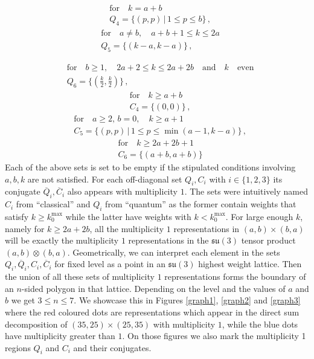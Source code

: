 \documentclass[a4paper,11pt]{article}
\theoremstyle{plain}
\theoremstyle{definition}
\newcommand{\mycomment}[1]{}
\newcommand{\kmax}{k_0^{\text{max}}}
\begin{document}
     \begin{align}\label{d4}
        &\text{for}\quad k=a+b \nonumber \\
        &Q_4=\{(p,p)\,|\, 1\leq p\leq b\}\,,
    \end{align}
     \begin{align}\label{d5}
        &\text{for}\quad a\neq b,\quad  a+b+1 \leq k\leq 2a \nonumber \\
        &Q_5=\{(k-a,k-a)\}\,,
    \end{align}
     \mycomment{
     \begin{align}\label{d6}
        &\text{for}\quad k=2a \nonumber \\
        &Q_6=\{(a,a)\}\,,
    \end{align}
    }
    \begin{align}\label{d7}
        &\text{for}\quad b\geq 1,\quad  2a+2 \leq k\leq 2a+2b \quad \text{and} \quad k \quad \text{even} \nonumber \\
        &Q_6=\bigg\lbrace\left(\frac{k}{2},\frac{k}{2}\right)\bigg \rbrace\,,
    \end{align}
    \begin{align}\label{c4}
        & \text{for}\quad  k\geq a+b\nonumber \\
        &C_4=\{(0,0)\}\,,
    \end{align}
      \begin{align} \label{c5}
        &\text{for}\quad a\geq 2,\, b=0,\quad  k\geq a+1 \nonumber \\
        &C_5=\{(p,p)\,|\, 1\leq p\leq \operatorname{min}(a-1,k-a)\}\,,
    \end{align}
     \begin{align}\label{c6}
        & \text{for}\quad  k\geq 2a+2b+1 \nonumber \\
        &C_6=\{(a+b,a+b)\}
    \end{align}
Each of  the above sets is set to be  empty if the stipulated conditions involving $a,b,k$ are not satisfied. For each off-diagonal set $Q_i,C_i$ with $i\in\{1,2,3\}$ its conjugate $\overline{Q}_i,\overline{C}_i$ also appears with multiplicity $1$. The sets were intuitively named $C_i$ from ``classical'' and $Q_i$ from ``quantum'' as the former contain weights that satisfy $k\geq \kmax$ while the latter have weights with $ k<\kmax$. For large enough $k$, namely for $k\geq 2a+2b$, all the multiplicity $1$ representations in $(a,b)\times (b,a)$ will be exactly the multiplicity $1$ representations in the $\mathfrak{su}(3)$ tensor product $(a,b)\otimes (b,a)$. Geometrically, we can interpret each element in the sets $Q_i,\overline{Q}_i,C_i,\overline{C}_i$ for fixed level as a point in an $\mathfrak{su}(3)$ highest weight lattice. Then the union of all these sets of multiplicity $1$ representations forms the boundary of an $n$-sided polygon in that lattice. Depending on the level and the values of $a$ and $b$ 
we get $3\le n \le 7$. 
We showcase this in Figures \ref{graph1}, \ref{graph2} and \ref{graph3} where the red coloured dots are representations which appear in the direct sum decomposition of $(35,25)\times (25,35)$ with multiplicity $1$, while the blue dots have multiplicity greater than $1$. On those figures we also mark the multiplicity 1 regions $Q_i$ and $C_i$ and their conjugates.  
\end{document}
